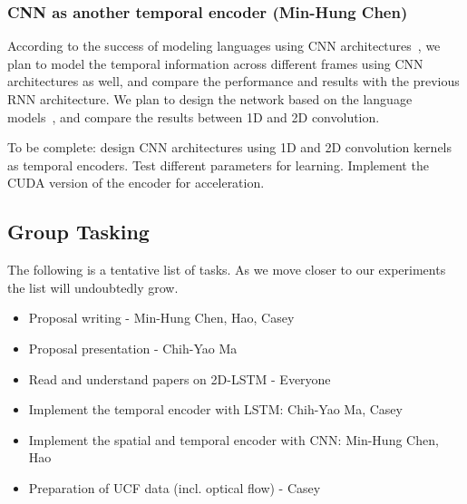 \subsubsection*{CNN as another temporal encoder (Min-Hung Chen)}
According to the success of modeling languages using CNN architectures~\cite{cnnSC,cnnMNLS}, we plan to model the temporal information across different frames using CNN architectures as well, and compare the performance and results with the previous RNN architecture. We plan to design the network based on the language models~\cite{cnnSC,cnnMNLS}, and compare the results between 1D and 2D convolution. 

To be complete: design CNN architectures using 1D and 2D convolution kernels as temporal encoders. Test different parameters for learning. Implement the CUDA version of the encoder for acceleration.

\subsection*{Group Tasking}
The following is a tentative list of tasks. As we move closer to our experiments the list will undoubtedly grow. 
\begin{itemize}
\item Proposal writing - Min-Hung Chen, Hao, Casey
\item Proposal presentation - Chih-Yao Ma
\item Read and understand papers on 2D-LSTM - Everyone
\item Implement the temporal encoder with LSTM: Chih-Yao Ma, Casey
\item Implement the spatial and temporal encoder with CNN: Min-Hung Chen, Hao
\item Preparation of UCF data (incl. optical flow) - Casey
\end{itemize}

